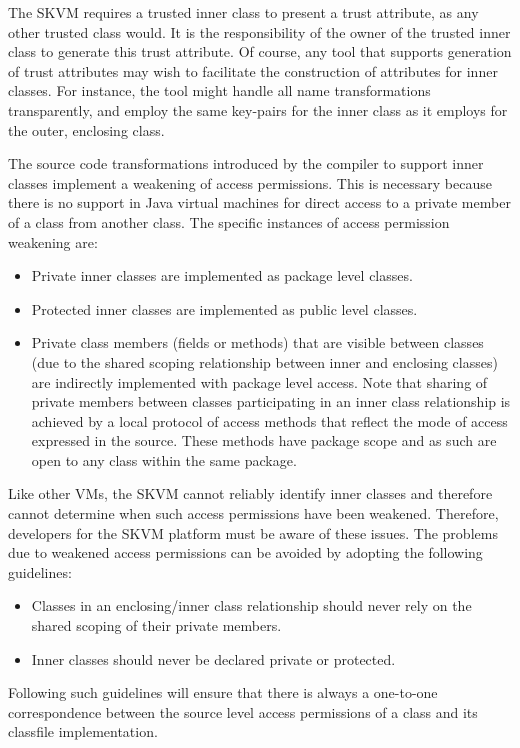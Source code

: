 \documentclass{llncs}
\begin{document}
The SKVM requires a trusted inner class to present a trust attribute,
as any other trusted class would. It is the responsibility of the
owner of the trusted inner class to generate this trust attribute.
Of course, any tool that supports generation of trust attributes
may wish to facilitate the construction of attributes for inner
classes. For instance, the tool might handle all name transformations
transparently, and employ the same key-pairs for the inner class
as it employs for the outer, enclosing class.

The source code transformations introduced by the compiler to support
inner classes implement a weakening of access permissions. This is
necessary because there is no support in Java virtual machines for
direct access to a private member of a class from another class.
The specific instances of access permission weakening are:
\begin{itemize}
  \item Private inner classes are implemented as package
  level classes.
  \item Protected inner classes are implemented as public level classes.
  \item Private class members (fields or methods) that are visible between
  classes (due to the shared scoping relationship between inner and enclosing
  classes) are indirectly implemented with package level
  access. Note that sharing of private members between classes
  participating in an inner class relationship is achieved
  by a local protocol of access methods that reflect the mode
  of access expressed in the source. These methods have package
  scope and as such are open to any class within the same
  package.
\end{itemize}

Like other VMs, the SKVM cannot reliably identify inner classes and
therefore cannot determine when such access permissions have been
weakened. Therefore, developers for the SKVM platform must be aware
of these issues. The problems due to weakened access permissions
can be avoided by adopting the following guidelines:
\begin{itemize}
  \item Classes in an enclosing/inner class relationship
  should never rely on the shared scoping of their private
  members.
  \item Inner classes should never be declared	private or protected.
\end{itemize}

Following such guidelines will ensure that there is always a
one-to-one correspondence between the source level access permissions
of a class and its classfile implementation.
\end{document}
